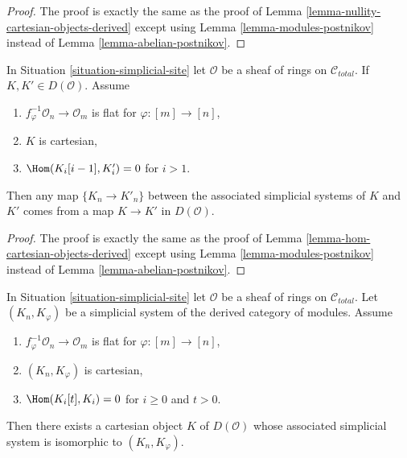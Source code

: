 \begin{proof}
The proof is exactly the same as the proof of
Lemma \ref{lemma-nullity-cartesian-objects-derived} except using
Lemma \ref{lemma-modules-postnikov} instead of
Lemma \ref{lemma-abelian-postnikov}.
\end{proof}

\begin{lemma}
\label{lemma-hom-cartesian-modules-derived}
In Situation \ref{situation-simplicial-site} let $\mathcal{O}$ be
a sheaf of rings on $\mathcal{C}_{total}$.
If $K, K' \in D(\mathcal{O})$.
Assume
\begin{enumerate}
\item $f_\varphi^{-1}\mathcal{O}_n \to \mathcal{O}_m$ is flat for
$\varphi : [m] \to [n]$,
\item $K$ is cartesian,
\item $\Hom(K_i[i - 1], K'_i) = 0$ for $i > 1$.
\end{enumerate}
Then any map $\{K_n \to K'_n\}$ between the associated simplicial systems 
of $K$ and $K'$ comes from a map $K \to K'$ in $D(\mathcal{O})$.
\end{lemma}

\begin{proof}
The proof is exactly the same as the proof of
Lemma \ref{lemma-hom-cartesian-objects-derived} except using
Lemma \ref{lemma-modules-postnikov} instead of
Lemma \ref{lemma-abelian-postnikov}.
\end{proof}

\begin{lemma}
\label{lemma-cartesian-module-derived-from-simplicial}
In Situation \ref{situation-simplicial-site} let $\mathcal{O}$ be
a sheaf of rings on $\mathcal{C}_{total}$. Let
$(K_n, K_\varphi)$ be a simplicial system of the derived category
of modules. Assume
\begin{enumerate}
\item $f_\varphi^{-1}\mathcal{O}_n \to \mathcal{O}_m$ is flat for
$\varphi : [m] \to [n]$,
\item $(K_n, K_\varphi)$ is cartesian,
\item $\Hom(K_i[t], K_i) = 0$ for $i \geq 0$ and $t > 0$.
\end{enumerate}
Then there exists a cartesian object $K$ of $D(\mathcal{O})$
whose associated simplicial system is isomorphic to $(K_n, K_\varphi)$.
\end{lemma}

